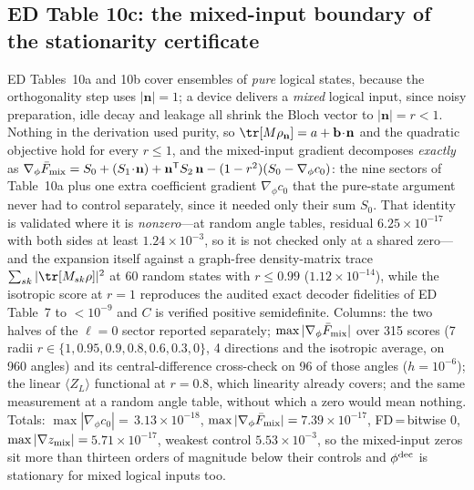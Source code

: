 \documentclass[10pt,a4paper]{article}
\begin{document}
\subsection*{ED Table 10c: the mixed-input boundary of the stationarity certificate}
ED Tables~10a and 10b cover ensembles of \emph{pure} logical states, because the
orthogonality step uses $|\mathbf n|=1$; a device delivers a \emph{mixed} logical
input, since noisy preparation, idle decay and leakage all shrink the Bloch vector
to $|\mathbf n|=r<1$. Nothing in the derivation used purity, so
$\tr[M\rho_{\mathbf n}]=a+\mathbf b\!\cdot\!\mathbf n$ and the quadratic objective
hold for every $r\le1$, and the mixed-input gradient decomposes \emph{exactly} as
$\nabla_\phi\bar F_{\rm mix}=S_0+(S_1\!\cdot\!\mathbf n)+\mathbf n^{\mathsf T}S_2\,\mathbf n-(1-r^2)(S_0-\nabla_\phi c_0)$:
the nine sectors of Table~10a plus one
extra coefficient gradient $\nabla_\phi c_0$ that the pure-state argument never had
to control separately, since it needed only their sum $S_0$. That identity is
validated where it is \emph{nonzero}---at random angle tables, residual $6.25\times 10^{-17}$ with both
sides at least $1.24\times 10^{-3}$, so it is not checked only at a shared zero---and the expansion itself
against a graph-free density-matrix trace $\sum_{sk}|\tr[M_{sk}\rho]|^2$ at $60$
random states with $r\le0.99$ ($1.12\times 10^{-14}$), while the isotropic score at $r=1$ reproduces
the audited exact decoder fidelities of ED Table~7 to $<10^{-9}$ and $C$ is verified
positive semidefinite. Columns: the two halves of the $\ell=0$ sector reported
separately; $\max|\nabla_\phi\bar F_{\rm mix}|$ over 315 scores (7 radii
$r\in\{1,0.95,0.9,0.8,0.6,0.3,0\}$, 4 directions and the isotropic average, on 960
angles) and its central-difference cross-check on 96 of those angles ($h=10^{-6}$);
the linear $\langle Z_L\rangle$ functional at $r=0.8$, which linearity already
covers; and the same measurement at a random angle table, without which a zero would
mean nothing. Totals: $\max|\nabla_\phi c_0|=$\,$3.13\times 10^{-18}$,
$\max|\nabla_\phi\bar F_{\rm mix}|=$\,$7.39\times 10^{-17}$, FD\,=\,bitwise $0$,
$\max|\nabla z_{\rm mix}|=$\,$5.71\times 10^{-17}$, weakest control $5.53\times 10^{-3}$, so the mixed-input zeros sit
more than thirteen orders of magnitude below their controls and $\phi^{\rm dec}$ is
stationary for mixed logical inputs too.
\end{document}
